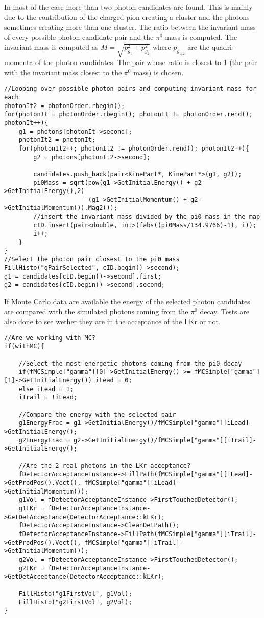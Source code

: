 In most of the case more than two photon candidates are found. This is mainly due to the
contribution of the charged pion creating a cluster and the photons sometimes creating more than one
cluster. The ratio between the invariant mass of every possible photon candidate pair and the
$\pi^0$ mass is computed. The invariant mass is computed as $M = \sqrt{p_{g_1}^2 + p_{g_2}^2}$ where
$p_{g_{1,2}}$ are the quadri-momenta of the photon candidates. The pair whose ratio is closest to 1
(the pair with the invariant mass closest to the $\pi^0$ mass) is chosen.
\begin{lstlisting}
//Looping over possible photon pairs and computing invariant mass for each
photonIt2 = photonOrder.rbegin();
for(photonIt = photonOrder.rbegin(); photonIt != photonOrder.rend(); photonIt++){
	g1 = photons[photonIt->second];
	photonIt2 = photonIt;
	for(photonIt2++; photonIt2 != photonOrder.rend(); photonIt2++){
		g2 = photons[photonIt2->second];

		candidates.push_back(pair<KinePart*, KinePart*>(g1, g2));
		pi0Mass = sqrt(pow(g1->GetInitialEnergy() + g2->GetInitialEnergy(),2)
					 - (g1->GetInitialMomentum() + g2->GetInitialMomentum()).Mag2());
		//insert the invariant mass divided by the pi0 mass in the map
		cID.insert(pair<double, int>(fabs((pi0Mass/134.9766)-1), i));
		i++;
	}
}
//Select the photon pair closest to the pi0 mass
FillHisto("gPairSelected", cID.begin()->second);
g1 = candidates[cID.begin()->second].first;
g2 = candidates[cID.begin()->second].second;
\end{lstlisting}

If Monte Carlo data are available the energy of the selected photon candidates are compared with the
simulated photons coming from the $\pi^0$ decay. Tests are also done to see wether they are in the
acceptance of the LKr or not. 
\begin{lstlisting}
//Are we working with MC?
if(withMC){

	//Select the most energetic photons coming from the pi0 decay
	if(fMCSimple["gamma"][0]->GetInitialEnergy() >= fMCSimple["gamma"][1]->GetInitialEnergy()) iLead = 0;
	else iLead = 1;
	iTrail = !iLead;

	//Compare the energy with the selected pair
	g1EnergyFrac = g1->GetInitialEnergy()/fMCSimple["gamma"][iLead]->GetInitialEnergy();
	g2EnergyFrac = g2->GetInitialEnergy()/fMCSimple["gamma"][iTrail]->GetInitialEnergy();

	//Are the 2 real photons in the LKr acceptance?
	fDetectorAcceptanceInstance->FillPath(fMCSimple["gamma"][iLead]->GetProdPos().Vect(), fMCSimple["gamma"][iLead]->GetInitialMomentum());
	g1Vol = fDetectorAcceptanceInstance->FirstTouchedDetector();
	g1LKr = fDetectorAcceptanceInstance->GetDetAcceptance(DetectorAcceptance::kLKr);
	fDetectorAcceptanceInstance->CleanDetPath();
	fDetectorAcceptanceInstance->FillPath(fMCSimple["gamma"][iTrail]->GetProdPos().Vect(), fMCSimple["gamma"][iTrail]->GetInitialMomentum());
	g2Vol = fDetectorAcceptanceInstance->FirstTouchedDetector();
	g2LKr = fDetectorAcceptanceInstance->GetDetAcceptance(DetectorAcceptance::kLKr);

	FillHisto("g1FirstVol", g1Vol);
	FillHisto("g2FirstVol", g2Vol);
}
\end{lstlisting}


